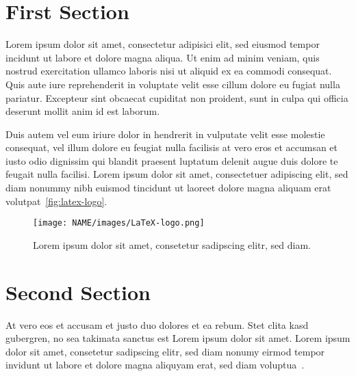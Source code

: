 


\section{First Section}
Lorem ipsum dolor sit amet, consectetur adipisici elit, sed eiusmod tempor incidunt ut labore et 
dolore magna aliqua. Ut enim ad minim veniam, quis nostrud exercitation ullamco laboris nisi ut 
aliquid ex ea commodi consequat. Quis aute iure reprehenderit in voluptate velit esse cillum dolore 
eu fugiat nulla pariatur. Excepteur sint obcaecat cupiditat non proident, sunt in culpa qui officia 
deserunt mollit anim id est laborum.

Duis autem vel eum iriure dolor in hendrerit in vulputate velit esse molestie consequat, vel illum 
dolore eu feugiat nulla facilisis at vero eros et accumsan et iusto odio dignissim qui blandit 
praesent luptatum delenit augue duis dolore te feugait nulla facilisi. Lorem ipsum dolor sit amet, 
consectetuer adipiscing elit, sed diam nonummy nibh euismod tincidunt ut laoreet dolore magna 
aliquam erat volutpat~\autoref{fig:latex-logo}.

\begin{figure}[!htb]
  \centering
  \texttt{[image: NAME/images/LaTeX-logo.png]}
  \caption{Lorem ipsum dolor sit amet, consetetur sadipscing elitr, sed diam.}
  \label{fig:latex-logo}
\end{figure} 

\section{Second Section}
At vero eos et accusam et justo duo dolores et ea rebum. Stet clita kasd gubergren, no sea takimata 
sanctus est Lorem ipsum dolor sit amet. Lorem ipsum dolor sit amet, consetetur sadipscing elitr, sed 
diam nonumy eirmod tempor invidunt ut labore et dolore magna aliquyam erat, sed diam 
voluptua~.


